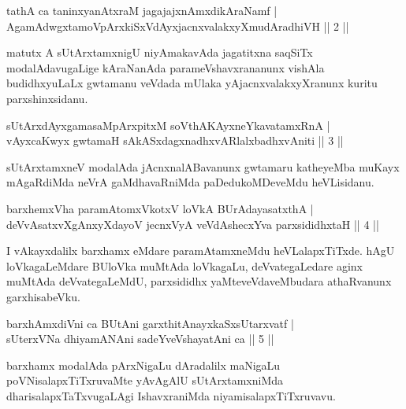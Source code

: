 \begin{shl}
tathA ca taninxyanAtxraM jagajajxnAmxdikAraNamf |\\
AgamAdwgxtamoV\s pArxkiSxVdAyxjacnxvalakxyXmudAradhiVH \hfill || 2 ||
\end{shl}

\begin{artha}
matutx A sUtArxtamxnigU niyAmakavAda jagatitxna saqSiTx modalAdavugaLige kAraNanAda parameVshavxrananunx vishAla budidhxyuLaLx gwtamanu veVdada mUlaka yAjacnxvalakxyXranunx kuritu parxshinxsidanu.
\end{artha}

\begin{shl}
sUtArxdAyxgamasaMpArxpitxM soV\s thA\s \s KAyxneYkavatamxRnA |\\
vAyxcaKwyx gwtamaH sAkASxdagxnadhxvARlalxbadhxvAniti \hfill || 3 ||
\end{shl}

\begin{artha}
sUtArxtamxneV modalAda jAcnxnalABavanunx gwtamaru katheyeMba muKayx mAgaRdiMda neVrA gaMdhavaRniMda paDedukoMDeveMdu heVLisidanu.
\end{artha}

\begin{shl}
barxhemxVha paramAtomxVkotxV loVkA BUrAdayasatxthA |\\
deVvAsatxvXgAnxyXdayoV jecnxVyA veVdAshecxYva parxsididhxtaH \hfill || 4 ||
\end{shl}

\begin{artha}
I vAkayxdalilx barxhamx eMdare paramAtamxneMdu heVLalapxTiTxde. hAgU loVkagaLeMdare BUloVka muMtAda loVkagaLu, deVvategaLedare aginx muMtAda deVvategaLeMdU, parxsididhx yaMteveVdaveMbudara athaRvanunx garxhisabeVku.
\end{artha}%


\begin{shl}
barxhAmxdiVni ca BUtAni garxthitAnayxkaSxsUtarxvatf |\\
sUterxVNa dhiyamANAni sadeYveVshayatAni ca \hfill || 5 ||
\end{shl}

\begin{artha}
barxhamx modalAda pArxNigaLu dAradalilx maNigaLu poVNisalapxTiTxruvaMte yAvAgAlU sUtArxtamxniMda dharisalapxTaTxvugaLAgi IshavxraniMda niyamisalapxTiTxruvavu.
\end{artha}

